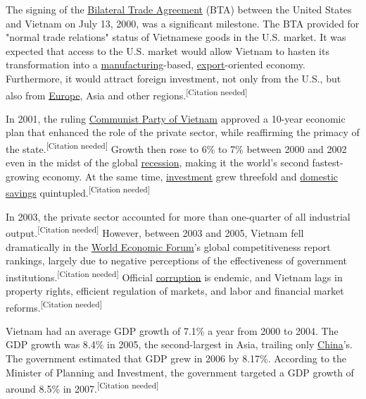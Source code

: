 \documentclass{article}
\begin{document}
The signing of the \href{https://en.wikipedia.org/wiki/Bilateral_Trade_Agreement}{Bilateral Trade Agreement} (BTA) between the United States and Vietnam on July 13, 2000, was a significant milestone. The BTA provided for "normal trade relations" status of Vietnamese goods in the U.S. market. It was expected that access to the U.S. market would allow Vietnam to hasten its transformation into a \href{https://en.wikipedia.org/wiki/Manufacturing}{manufacturing}-based, \href{https://en.wikipedia.org/wiki/Export}{export}-oriented economy. Furthermore, it would attract foreign investment, not only from the U.S., but also from \href{https://en.wikipedia.org/wiki/Europe}{Europe}, Asia and other regions.\textsuperscript{[Citation needed]}

In 2001, the ruling \href{https://en.wikipedia.org/wiki/Communist_Party_of_Vietnam}{Communist Party of Vietnam} approved a 10-year economic plan that enhanced the role of the private sector, while reaffirming the primacy of the state.\textsuperscript{[Citation needed]} Growth then rose to 6\% to 7\% between 2000 and 2002 even in the midst of the global \href{https://en.wikipedia.org/wiki/Recession}{recession}, making it the world's second fastest-growing economy. At the same time, \href{https://en.wikipedia.org/wiki/Investment}{investment} grew threefold and \href{https://en.wikipedia.org/wiki/Domestic_savings}{domestic savings} quintupled.\textsuperscript{[Citation needed]}

In 2003, the private sector accounted for more than one-quarter of all industrial output.\textsuperscript{[Citation needed]} However, between 2003 and 2005, Vietnam fell dramatically in the \href{https://en.wikipedia.org/wiki/World_Economic_Forum}{World Economic Forum}'s global competitiveness report rankings, largely due to negative perceptions of the effectiveness of government institutions.\textsuperscript{[Citation needed]} Official \href{https://en.wikipedia.org/wiki/Political_corruption}{corruption} is endemic, and Vietnam lags in property rights, efficient regulation of markets, and labor and financial market reforms.\textsuperscript{[Citation needed]}

Vietnam had an average GDP growth of 7.1\% a year from 2000 to 2004. The GDP growth was 8.4\% in 2005, the second-largest in Asia, trailing only \href{https://en.wikipedia.org/wiki/China}{China}'s. The government estimated that GDP grew in 2006 by 8.17\%. According to the Minister of Planning and Investment, the government targeted a GDP growth of around 8.5\% in 2007.\textsuperscript{[Citation needed]}
\end{document}
